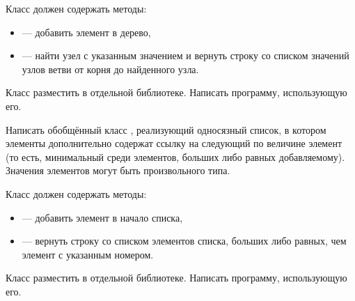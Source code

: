 Класс должен содержать методы:
\begin{itemize}
\item {} — добавить элемент в дерево,
\item {} — найти узел с указанным значением и вернуть
  строку со списком значений узлов ветви от корня до найденного узла.
\end{itemize}

Класс разместить в отдельной библиотеке. Написать программу,
использующую его.

\task Написать обобщённый класс , реализующий
односязный список, в котором элементы дополнительно содержат ссылку на
следующий по величине элемент (то есть, минимальный среди элементов,
больших либо равных добавляемому). Значения элементов могут быть
произвольного типа.

Класс должен содержать методы:
\begin{itemize}
\item {} — добавить элемент в начало списка,
\item {} — вернуть строку со списком элементов списка,
  больших либо равных, чем элемент с указанным номером.
\end{itemize}

Класс разместить в отдельной библиотеке. Написать программу,
использующую его.
